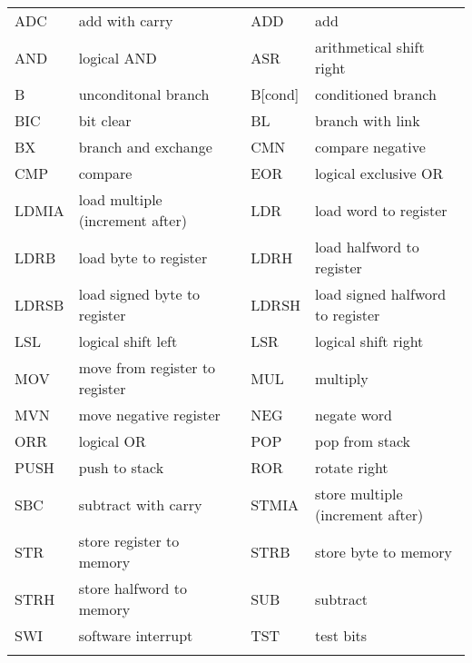 \ttfamily
\small
\begin{tabular}{|m{1cm}|m{5cm}|p{1px}|m{1.3cm}|m{5.1cm}|}
	\hhline{--~--}
	ADC & add with carry &&	ADD & add \\
	\hhline{--~--}
	AND & logical AND &&	ASR & arithmetical shift right \\
	\hhline{--~--}
	B & unconditonal branch &&	B[cond] & conditioned branch \\
	\hhline{--~--}
	BIC & bit clear &&	BL & branch with link \\
	\hhline{--~--}
	BX & branch and exchange &&	CMN & compare negative \\
	\hhline{--~--}
	CMP & compare &&	EOR & logical exclusive OR \\
	\hhline{--~--}
	LDMIA & load multiple (increment after) &&	LDR & load word to register \\
	\hhline{--~--}
	LDRB & load byte to register &&	LDRH & load halfword to register \\
	\hhline{--~--}
	LDRSB & load signed byte to register &&	LDRSH & load signed halfword to register \\
	\hhline{--~--}
	LSL & logical shift left &&	LSR & logical shift right \\
	\hhline{--~--}
	MOV & move from register to register &&	MUL & multiply \\
	\hhline{--~--}
	MVN & move negative register &&	NEG & negate word \\
	\hhline{--~--}
	ORR & logical OR &&	POP & pop from stack \\
	\hhline{--~--}
	PUSH & push to stack &&	ROR & rotate right \\
	\hhline{--~--}
	SBC & subtract with carry &&	STMIA & store multiple (increment after) \\
	\hhline{--~--}
	STR & store register to memory &&	STRB & store byte to memory \\
	\hhline{--~--}
	STRH & store halfword to memory &&	SUB & subtract \\
	\hhline{--~--}
	SWI & software interrupt &&	TST & test bits \\
	\hhline{--~--}
\end{tabular}
